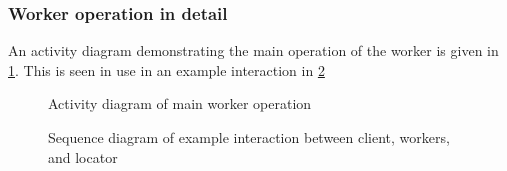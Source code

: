 \subsubsection{Worker operation in detail}

An activity diagram demonstrating the main operation of the worker is given in \cref{fig:workerops}.
This is seen in use in an example interaction in \cref{fig:sysinteract}

\begin{figure}

\caption{Activity diagram of main worker operation}
\label{fig:workerops}
\end{figure}

\begin{figure}

\caption{Sequence diagram of example interaction between client, workers, and locator}
\label{fig:sysinteract}
\end{figure}
